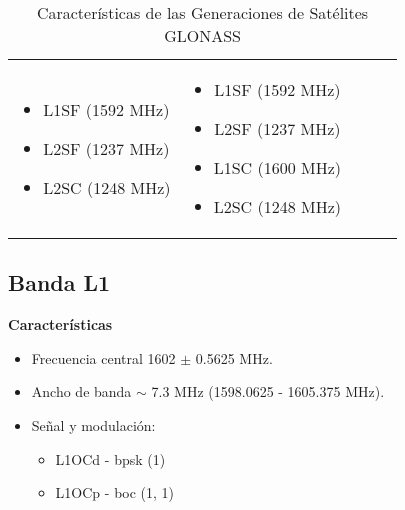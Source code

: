 \begin{justify}
\begin{table}[H]
\begin{tabular}{|p{3cm}|c|c|c|c|}
{{\begin{itemize}[label={}, leftmargin=0pt, topsep=0pt, partopsep=0pt, parsep=0pt, itemsep=0pt]
                        \item L1SF (1592 MHz)
                        \item L2SF (1237 MHz)
                        \item L2SC (1248 MHz)
                    \end{itemize}
                }
            } &
            \parbox[t]{2.5cm}{
                \vspace{-7pt}
                {\fontsize{9}{11}\selectfont
                    \begin{itemize}[label={}, leftmargin=0pt, topsep=0pt, partopsep=0pt, parsep=0pt, itemsep=0pt]
                        \item L1SF (1592 MHz)
                        \item L2SF (1237 MHz)
                        \item L1SC (1600 MHz)
                        \item L2SC (1248 MHz)
                    \end{itemize}
                    \vspace{10pt}
                }
            } \\
            \hline
        \end{tabular}
        \caption{Características de las Generaciones de Satélites GLONASS}
        \label{tab:glonass_satellites}
    \end{table}
\end{justify}

\subsection{Banda L1}

\begin{justify}
    \textbf{Características}
    \begin{itemize}
        \item Frecuencia central 1602 $\pm$ 0.5625 MHz.
        \item Ancho de banda \( \sim \) 7.3 MHz (1598.0625 - 1605.375 MHz).
        \item Señal y modulación:
        \begin{itemize}
            \item L1OCd - \gls{bpsk} (1)
            \item L1OCp - \gls{boc} (1, 1)
        \end{itemize}
    \end{itemize}
\end{justify}

